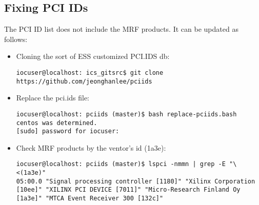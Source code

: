 \documentclass[11pt
  , a4paper
  , article
  , oneside
  , showtrims
]{memoir}
\begin{document}
\subsection{Fixing PCI IDs}
The PCI ID list does not include the MRF products. It can be updated as follows:
\begin{itemize}
\item Cloning the sort of ESS customized PCI.IDS db:
\begin{lstlisting}[style=termstyle]
iocuser@localhost: ics_gitsrc$ git clone https://github.com/jeonghanlee/pciids
\end{lstlisting}
\item Replace the pci.ids file:
\begin{lstlisting}[style=termstyle]
iocuser@localhost: pciids (master)$ bash replace-pciids.bash 
centos was determined.
[sudo] password for iocuser: 
\end{lstlisting}
\item Check MRF products by the ventor's id (1a3e):
\begin{lstlisting}[style=termstyle]
iocuser@localhost: pciids (master)$ lspci -nmmn | grep -E "\<(1a3e)"
05:00.0 "Signal processing controller [1180]" "Xilinx Corporation [10ee]" "XILINX PCI DEVICE [7011]" "Micro-Research Finland Oy [1a3e]" "MTCA Event Receiver 300 [132c]"
\end{lstlisting}
\end{itemize}
\end{document}
